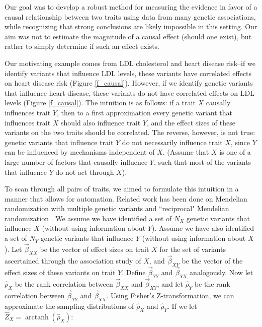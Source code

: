 \documentclass[11pt,titlepage]{article}
\DeclareMathOperator\arctanh{arctanh}
\begin{document}
Our goal was to develop a robust method for measuring the evidence in favor of a causal relationship between two traits using data from many genetic associations, while recognizing that strong conclusions are likely impossible in this setting. Our aim was not to estimate the magnitude of a causal effect (should one exist), but rather to simply determine if such an effect exists. 

Our motivating example comes from LDL cholesterol and heart disease risk--if we identify variants that influence LDL levels, these variants have correlated effects on heart disease risk (Figure \ref{f_causal}). However, if we identify genetic variants that influence heart disease, these variants do not have correlated effects on LDL levels (Figure \ref{f_causal}). The intuition is as follows: if a trait $X$ causally influences trait $Y$, then to a first approximation every genetic variant that influences trait $X$ should also influence trait $Y$, and the effect sizes of these variants on the two traits should be correlated. The reverse, however, is not true: genetic variants that influence trait $Y$ do not necessarily influence trait $X$, since $Y$ can be influenced by mechanisms independent of $X$. (Assume that $X$ is one of a large number of factors that causally influence $Y$, such that most of the variants that influence $Y$ do not act through $X$).

To scan through all pairs of traits, we aimed to formulate this intuition in a manner that allows for automation. Related work has been done on Mendelian randomization with multiple genetic variants \citep{Do:2013aa, Evans:2013aa, Davey-Smith:2014aa} and ``reciprocal" Mendelian randomization \citep{Timpson:2011aa}. We assume we have identified a set of $N_X$ genetic variants that influence $X$ (without using information about $Y$). Assume we have also identified a set of $N_Y$ genetic variants that influence $Y$ (without using information about $X$). Let $\vec \beta_{XX}$ be the vector of effect sizes on trait $X$ for the set of variants ascertained through the association study of $X$, and  $\vec \beta_{XY}$ be the vector of the effect sizes of these variants on trait $Y$. Define $\vec \beta_{YY}$ and $\vec \beta_{YX}$ analogously. Now let $\hat \rho_X$ be the rank correlation between $\vec \beta_{XX}$ and $\vec \beta_{XY}$,  and let $\hat \rho_Y$ be the rank correlation between $\vec \beta_{YY}$ and $\vec \beta_{YX}$. Using Fisher's Z-transformation, we can approximate the sampling distributions of  $\hat \rho_X$ and $\hat \rho_Y$. If we let $\hat Z_X = \arctanh(\hat \rho_X)$:
\end{document}
